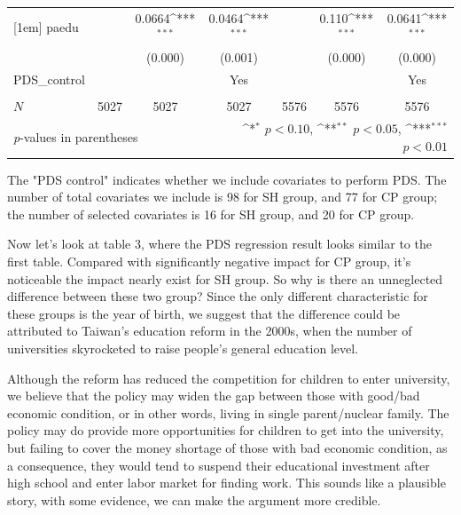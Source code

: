 \documentclass[]{AEA}
\def\sym#1{\ifmmode^{#1}\else\(^{#1}\)\fi}
\begin{document}
\begin{center}
\begin{table}
\begin{tabular}{l*{6}c}
    [1em]
    paedu       &                     &      0.0664\sym{***}&      0.0464\sym{***}&                     &       0.110\sym{***}&      0.0641\sym{***}\\
        &                     &     (0.000)         &     (0.001)         &                     &     (0.000)         &     (0.000)         \\
    [1em]
    PDS\_control  &   &  &  Yes    &  &    &  Yes \\
    &   &      &      &   &      &      \\
    \hline
    \(N\)       &        5027         &        5027         &        5027         &        5576         &        5576         &        5576         \\
    \bottomrule
    \multicolumn{3}{l}{\footnotesize \textit{p}-values in parentheses} & \multicolumn{4}{r}{\footnotesize \sym{*} \(p<0.10\), \sym{**} \(p<0.05\), \sym{***} \(p<0.01\)}\\
    \end{tabular}
    \begin{tablenotes}
        The "PDS control" indicates whether we include covariates to perform PDS.  The number of total covariates we include is 98 for SH group, and 77 for CP group; the number of selected covariates is 16 for SH group, and 20 for CP group.
    \end{tablenotes}
    \end{table}
    \end{center}

    Now let's look at table 3, where the PDS regression result looks similar to the first table.  Compared with significantly negative impact for CP group, it's noticeable the impact nearly exist for SH group. So why is there an unneglected difference between these two group?  Since the only different characteristic for these groups is the year of birth, we suggest that the difference could be attributed to Taiwan's education reform in the 2000s, when the number of universities skyrocketed to raise people's general education level. 
    
    Although the reform has reduced the competition for children to enter university, we believe that the policy may widen the gap between those with good/bad economic condition, or in other words, living in single parent/nuclear family. The policy may do provide more opportunities for children to get into the university, but failing to cover the money shortage of those with bad economic condition, as a consequence, they would tend to suspend their educational investment after high school and enter labor market for finding work.  This sounds like a plausible story, with some evidence, we can make the argument more credible.
\end{document}
